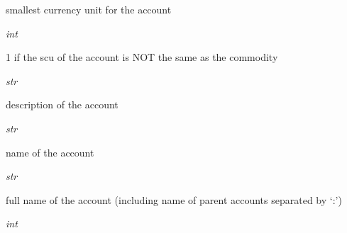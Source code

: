 \documentclass[letterpaper,10pt,english]{sphinxmanual}
\begin{document}
\begin{fulllineitems}
\begin{fulllineitems}
smallest currency unit for the account

\end{fulllineitems}


\begin{fulllineitems}
\label{api/piecash.model_core.account:piecash.model_core.account.Account.non_std_scu}
\emph{int}

1 if the scu of the account is NOT the same as the commodity

\end{fulllineitems}


\begin{fulllineitems}
\label{api/piecash.model_core.account:piecash.model_core.account.Account.description}
\emph{str}

description of the account

\end{fulllineitems}


\begin{fulllineitems}
\label{api/piecash.model_core.account:piecash.model_core.account.Account.name}
\emph{str}

name of the account

\end{fulllineitems}


\begin{fulllineitems}
\label{api/piecash.model_core.account:piecash.model_core.account.Account.fullname}
\emph{str}

full name of the account (including name of parent accounts separated by `:')

\end{fulllineitems}


\begin{fulllineitems}
\label{api/piecash.model_core.account:piecash.model_core.account.Account.placeholder}
\emph{int}


\end{fulllineitems}
\end{fulllineitems}
\end{document}
